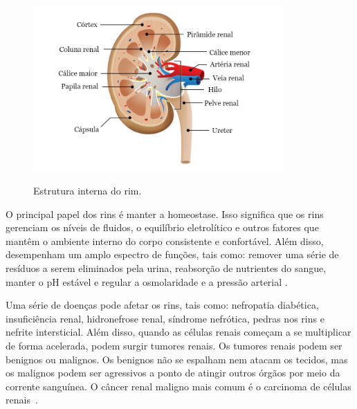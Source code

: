\begin{figure}[!ht]
    \centering
    \caption{Estrutura interna do rim.}
    \includegraphics[width=0.85\textwidth]{figuras/anatomia-rins-interno.png}
    \label{fig:anatomia-rins-interno}
\end{figure}

O principal papel dos rins é manter a homeostase. Isso significa que os rins gerenciam os níveis de fluidos, o equilíbrio eletrolítico e outros fatores que mantêm o ambiente interno do corpo consistente e confortável. Além disso, desempenham um amplo espectro de funções, tais como: remover uma série de resíduos a serem eliminados pela urina, reabsorção de nutrientes do sangue, manter o pH estável e regular a osmolaridade e a pressão arterial \cite{american_cancer,tim_newman,world_cancer}.



Uma série de doenças pode afetar os rins, tais como: nefropatia diabética, insuficiência renal, hidronefrose renal, síndrome nefrótica, pedras nos rins e nefrite intersticial. Além disso, quando as células renais começam a se multiplicar de forma acelerada, podem surgir tumores renais. Os tumores renais podem ser benignos ou malignos. Os benignos não se espalham nem atacam os tecidos, mas os malignos podem ser agressivos a ponto de atingir outros órgãos por meio da corrente sanguínea. O câncer renal maligno mais comum é o carcinoma de células renais~\cite{SHUCH201585,tim_newman}.

